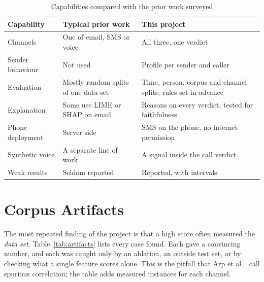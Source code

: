 {\begin{table}[H]
\caption{Capabilities compared with the prior work surveyed}
\label{tab:compare}
\centering\small{}
\begin{tabular}{|p{3.7cm}|p{5.0cm}|p{5.3cm}|}
\hline
\textbf{Capability} & \textbf{Typical prior work} & \textbf{This project} \\ \hline
Channels & One of email, SMS or voice & All three, one verdict \\ \hline
Sender behaviour & Not used & Profile per sender and caller \\ \hline
Evaluation & Mostly random splits of one data set & Time, person, corpus and channel splits; rules set in advance \\ \hline
Explanation & Some use LIME or SHAP on email & Reasons on every verdict, tested for faithfulness \\ \hline
Phone deployment & Server side & SMS on the phone, no internet permission \\ \hline
Synthetic voice & A separate line of work & A signal inside the call verdict \\ \hline
Weak results & Seldom reported & Reported, with intervals \\ \hline
\end{tabular}
\end{table}

\section{Corpus Artifacts}\label{sec:artifacts}
The most repeated finding of the project is that a high score often measured the \emph{data set}. Table~\ref{tab:artifacts} lists every case found. Each gave a convincing number, and each was caught only by an ablation, an outside test set, or by checking what a single feature scores alone. This is the pitfall that Arp et al.~\cite{arp2022dos} call spurious correlation; the table adds measured instances for each channel.

}

